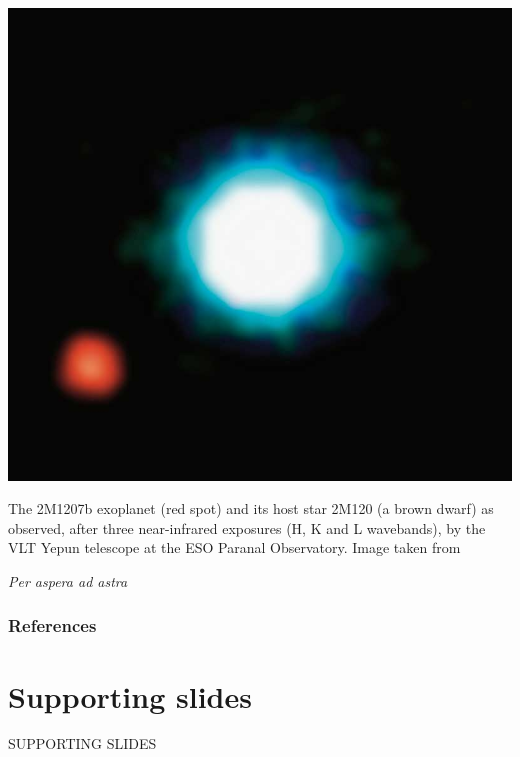 \documentclass[compress]{beamer}
\begin{document}
\begin{frame}
\begin{center}
\includegraphics[width=0.5\linewidth]{Pic/Exoplanet_picture.jpg}
\end{center}
\begin{center}
The 2M1207b exoplanet (red spot) and its host star 2M120 (a brown dwarf) as observed, after three near-infrared exposures (H, K and L wavebands), by the VLT Yepun telescope at the ESO Paranal Observatory. Image taken from \cite{exoplanet_pic}
\end{center}
\end{frame}

\begin{frame}
\begin{center}
\textit{Per aspera ad astra}
\end{center}
\end{frame}



\begin{frame}[t,allowframebreaks]
\frametitle{References}
\printbibliography
\end{frame}

\section{Supporting slides}
\begin{frame}
\begin{center}
SUPPORTING SLIDES
\end{center}
\end{frame}
\end{document}
